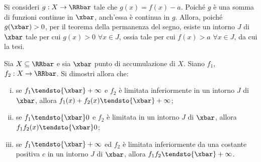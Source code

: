 \documentclass[11pt]{article}
\begin{document}
	\begin{solution}
		Si consideri $g : X \to \RRbar$ tale che $g(x) = f(x) - a$. Poiché $g$ è una somma di
		funzioni continue in $\xbar$, anch'essa è continua in $g$. Allora, poiché $g(\xbar) > 0$,
		per il teorema della permanenza del segno, esiste un intorno $J$ di $\xbar$ tale per cui
		$g(x) > 0$ $\forall x \in J$, ossia tale per cui $f(x) > a$ $\forall x \in J$, da cui la tesi.
	\end{solution}

	\begin{exercise}
		Sia $X \subseteq \RRbar$ e sia $\xbar$ punto di accumulazione di $X$. Siano
		$f_1$, $f_2 : X \to \RRbar$. Si dimostri allora che:
		
		\begin{enumerate}[(i)]
			\item se $f_1 \tendsto{\xbar} +\infty$ e $f_2$ è limitata inferiormente
			in un intorno $J$ di $\xbar$, allora $f_1(x) + f_2(x) \tendsto{\xbar} +\infty$;
			\item se $f_1 \tendsto{\xbar} 0$ e $f_2$ è limitata in un intorno $J$
			di $\xbar$, allora $f_1 f_2(x) \tendsto{\xbar} 0$;
			\item se $f_1 \tendsto{\xbar} +\infty$ ed $f_2$ è limitata inferiormente
			da una costante positiva $c$ in un intorno $J$ di $\xbar$, allora
			$f_1 f_2 \tendsto{\xbar} +\infty$. 
		\end{enumerate}
	\end{exercise}
\end{document}

